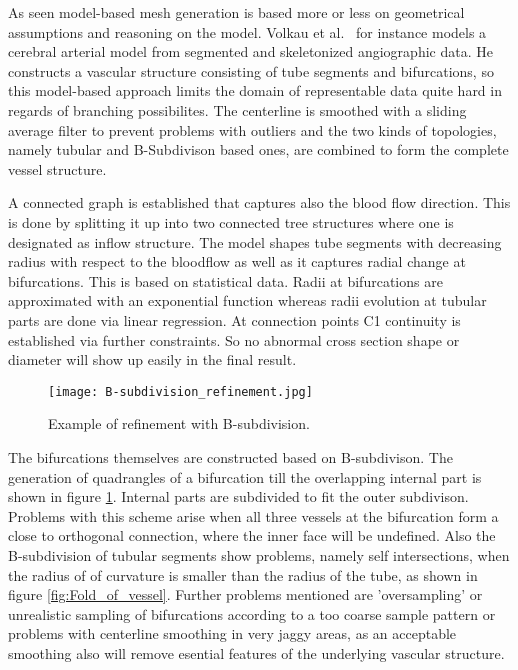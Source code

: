 As seen model-based mesh generation is based more or less on geometrical assumptions and reasoning on the model.
Volkau et al.~\cite{volkau2005geometric} for instance models a cerebral arterial model from segmented and skeletonized angiographic data. He constructs a vascular structure consisting of tube segments and bifurcations, so this model-based approach limits the domain of representable data quite hard in regards of branching possibilites. The centerline is smoothed with a sliding average filter to prevent problems with outliers and the two kinds of topologies, namely tubular and B-Subdivison based ones, are combined to form the complete vessel structure.

A connected graph is established that captures also the blood flow direction. This is done by splitting it up into two connected tree structures where one is designated as inflow structure. The model shapes tube segments with decreasing radius with respect to the bloodflow as well as it captures radial change at bifurcations. This is based on statistical data. Radii at bifurcations are approximated with an exponential function whereas radii evolution at tubular parts are done via linear regression. At connection points C1 continuity is established via further constraints. So no abnormal cross section shape or diameter will show up easily in the final result.

\begin{figure}[h]
	\centering
	\texttt{[image: B-subdivision\_refinement.jpg]} \\
	\caption{Example of refinement with B-subdivision.}
	\cite{volkau2005geometric}
	\label{fig:B-subdivision_refinement}
\end{figure}

The bifurcations themselves are constructed based on B-subdivison. The generation of quadrangles of a bifurcation till the overlapping internal part is shown in figure \ref{fig:B-subdivision_refinement}. Internal parts are subdivided to fit the outer subdivison. Problems with this scheme arise when all three vessels at the bifurcation form a close to orthogonal connection, where the inner face will be undefined. Also the B-subdivision of tubular segments show problems, namely self intersections, when the radius of of curvature is smaller than the radius of the tube, as shown in figure \ref{fig:Fold_of_vessel}.
Further problems mentioned are 'oversampling' or unrealistic sampling of bifurcations according to a too coarse sample pattern or problems with centerline smoothing in very jaggy areas, as an acceptable smoothing also will remove esential features of the underlying vascular structure.  

